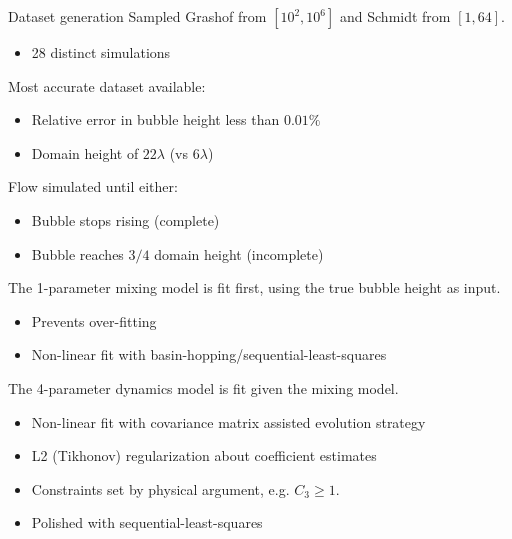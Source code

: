 \documentclass[12pt]{beamer}
\begin{document}
\begin{frame}{Dataset generation}
Sampled Grashof from $\left[10^2,10^6\right]$ and Schmidt from $\left[1,64\right]$.
\begin{itemize}
  \item 28 distinct simulations
\end{itemize}
\vspace{10pt} \pause

Most accurate dataset available:
\begin{itemize}
  \item Relative error in bubble height less than $0.01\%$
  \item Domain height of $22\lambda$ (vs $6\lambda$)
\end{itemize}
\vspace{10pt} \pause

Flow simulated until either:
\begin{itemize}
  \item Bubble stops rising (complete)
  \item Bubble reaches $3/4$ domain height (incomplete)
\end{itemize}
\end{frame}

\begin{frame}
The 1-parameter mixing model is fit first, using the true bubble height as input.
\begin{itemize}
  \item Prevents over-fitting
  \item Non-linear fit with basin-hopping/sequential-least-squares
\end{itemize}
\vspace{20pt} \pause

The 4-parameter dynamics model is fit given the mixing model.
\begin{itemize}
  \item Non-linear fit with covariance matrix assisted evolution strategy
  \item L2 (Tikhonov) regularization about coefficient estimates
  \item Constraints set by physical argument, e.g. $C_3 \ge 1$.
  \item Polished with sequential-least-squares
\end{itemize}
\end{frame}

\end{document}
